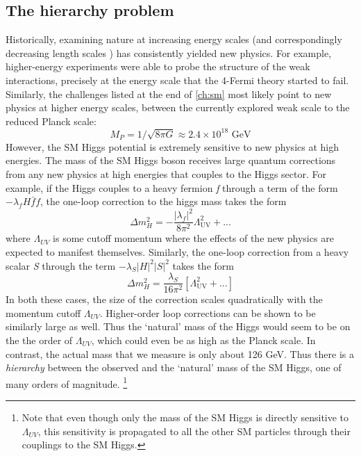 \subsection{The hierarchy problem}
Historically, examining nature at increasing energy scales (and correspondingly decreasing length scales ) has consistently yielded new physics. For example, higher-energy experiments were able to probe the structure of the weak interactions, precisely at the energy scale that the 4-Fermi theory started to fail. Similarly, the challenges listed at the end of \autoref{ch:sm} most likely point to new physics at higher energy scales, between the currently explored weak scale to the reduced Planck scale:
\begin{equation*}
M_P = 1/\sqrt{8\pi G} \approx 2.4\times 10^{18} \text{ GeV}
\end{equation*}
However, the SM Higgs potential is extremely sensitive to new physics at high energies. The mass of the SM Higgs boson receives large quantum corrections from any new physics at high energies that couples to the Higgs sector. For example, if the Higgs couples to a heavy fermion \emph{f} through a term of the form $-\lambda_fH\bar{f}f$, the one-loop correction to the higgs mass takes the form
\begin{equation}
\Delta m_H^2 = -\frac{|\lambda_f|^2}{8\pi^2}\Lambda_\text{UV}^2 + ...
\label{eq:one_loop_fermion}
\end{equation}
where $\Lambda_{UV}$ is some cutoff momentum where the effects of the new physics are expected to manifest themselves. Similarly, the one-loop correction from a heavy scalar \emph{S} through the term $-\lambda_S|H|^2|S|^2$ takes the form
\begin{equation}
  \Delta m_H^2 = \frac{\lambda_S}{16\pi^2}\left[\Lambda_\text{UV}^2 + ...\right]
\label{eq:one_loop_scalar}
\end{equation}
In both these cases, the size of the correction scales quadratically with the momentum cutoff $\Lambda_{UV}$. Higher-order loop corrections can be shown to be similarly large as well. Thus the `natural' mass of the Higgs would seem to be on the the order of $\Lambda_{UV}$, which could even be as high as the Planck scale. In contrast, the actual mass that we measure is only about 126 GeV. Thus there is a \emph{hierarchy} between the observed and the `natural' mass of the SM Higgs, one of many orders of magnitude. \footnote{Note that even though only the mass of the SM Higgs is directly sensitive to $\Lambda_{UV}$, this sensitivity is propagated to all the other SM particles through their couplings to the SM Higgs.}
